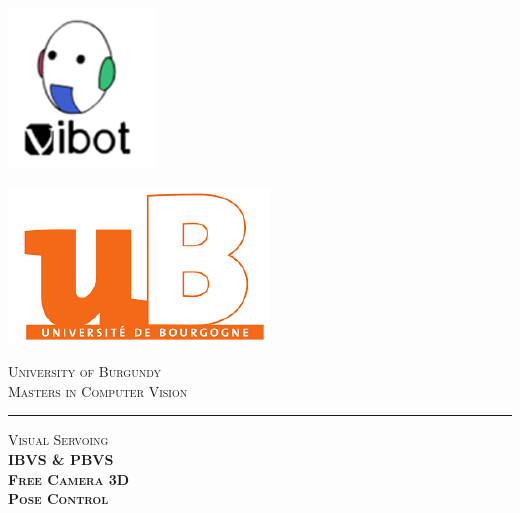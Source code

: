 \documentclass[a4paper,12pt]{article}
\newcommand{\HRule}{\rule{\linewidth}{0.5mm}}
\begin{document}
\begin{minipage}{0.50\textwidth} 
        \begin{flushleft}
        \includegraphics[scale = 0.50]{Logo-vibot.png}
        \end{flushleft}
\end{minipage}
\begin{minipage}{0.50\textwidth} 
        \begin{flushright}
                \includegraphics[scale = 0.50]{Logo-ub.png}
        \end{flushright}
\end{minipage}
\begin{center} 
        \vspace*{-1cm}
        \textsc{\Large University of Burgundy}\\[0.5cm]
        \textsc{\Large Masters in Computer Vision}
\end{center}
\vspace*{-0.5cm}
\HRule
\vspace*{4cm}
\begin{minipage}{0.9\textwidth} 
        \begin{center}                                                                                                                                                                  %
                \textsc{\LARGE Visual Servoing} \\[0.5cm]
                \textsc{\LARGE \textbf{IBVS \& PBVS \\[0.2cm] Free Camera 3D \\[0.2cm] Pose Control}} \\
                
        \end{center}
\end{minipage}\\[1.5cm]
\end{document}
